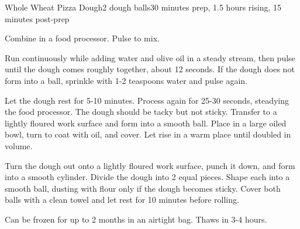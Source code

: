 \documentclass[../Cookbook.tex]{subfiles}
\begin{document}
\begin{recipe}[PizzaDough]{Whole Wheat Pizza Dough}{2 dough balls}{30 minutes prep, 1.5 hours rising, 15 minutes post-prep}

Combine in a food processor. Pulse to mix.

Run continuously while adding water and olive oil in a steady stream, then pulse until the dough comes roughly together, about 12 seconds. If the dough does not form into a ball, sprinkle with 1-2 teaspoons water and pulse again.

\newstep
Let the dough rest for 5-10 minutes. Process again for 25-30 seconds, steadying the food processor. The dough should be tacky but not sticky. Transfer to a lightly floured work surface and form into a smooth ball.
Place in a large oiled bowl, turn to coat with oil, and cover.
Let rise in a warm place until doubled in volume.

\newstep
Turn the dough out onto a lightly floured work surface, punch it down, and form into a smooth cylinder. Divide the dough into 2 equal pieces. Shape each into a smooth ball, dusting with flour only if the dough becomes sticky. Cover both balls with a clean towel and let rest for 10 minutes before rolling.



Can be frozen for up to 2 months in an airtight bag. Thaws in 3-4 hours.

\end{recipe}
\end{document}
